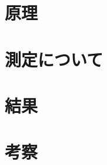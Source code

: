 \documentclass[uplatex,a4j,11pt,dvipdfmx]{jsarticle}
\newcommand{\gnu}[2]{
\begin{figure}[hptb]
\begin{center}

\caption{#1}
\label{fig:#2}
\end{center}
\end{figure}
}
\begin{document}
\section{原理}


\clearpage
\section{測定について}


\clearpage
\section{結果}
\clearpage
\clearpage
\section{考察}
\clearpage
\clearpage

\clearpage

\end{document}
